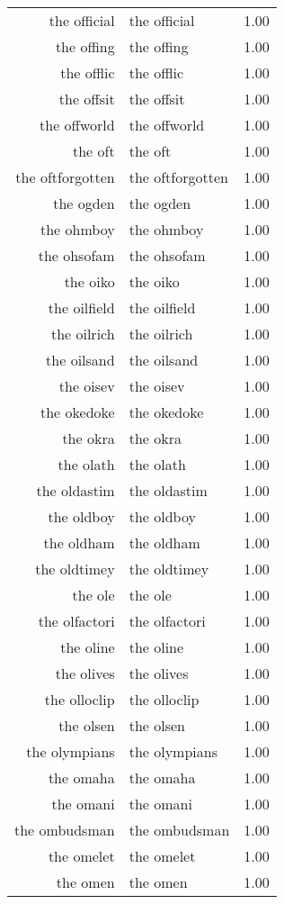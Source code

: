 \begin{table}[ht]
\begin{tabular}{rlr}
  the official & the official & 1.00 \\ 
  the offing & the offing & 1.00 \\ 
  the offlic & the offlic & 1.00 \\ 
  the offsit & the offsit & 1.00 \\ 
  the offworld & the offworld & 1.00 \\ 
  the oft & the oft & 1.00 \\ 
  the oftforgotten & the oftforgotten & 1.00 \\ 
  the ogden & the ogden & 1.00 \\ 
  the ohmboy & the ohmboy & 1.00 \\ 
  the ohsofam & the ohsofam & 1.00 \\ 
  the oiko & the oiko & 1.00 \\ 
  the oilfield & the oilfield & 1.00 \\ 
  the oilrich & the oilrich & 1.00 \\ 
  the oilsand & the oilsand & 1.00 \\ 
  the oisev & the oisev & 1.00 \\ 
  the okedoke & the okedoke & 1.00 \\ 
  the okra & the okra & 1.00 \\ 
  the olath & the olath & 1.00 \\ 
  the oldastim & the oldastim & 1.00 \\ 
  the oldboy & the oldboy & 1.00 \\ 
  the oldham & the oldham & 1.00 \\ 
  the oldtimey & the oldtimey & 1.00 \\ 
  the ole & the ole & 1.00 \\ 
  the olfactori & the olfactori & 1.00 \\ 
  the oline & the oline & 1.00 \\ 
  the olives & the olives & 1.00 \\ 
  the olloclip & the olloclip & 1.00 \\ 
  the olsen & the olsen & 1.00 \\ 
  the olympians & the olympians & 1.00 \\ 
  the omaha & the omaha & 1.00 \\ 
  the omani & the omani & 1.00 \\ 
  the ombudsman & the ombudsman & 1.00 \\ 
  the omelet & the omelet & 1.00 \\ 
  the omen & the omen & 1.00 \\ 

\end{tabular}
\end{table}
